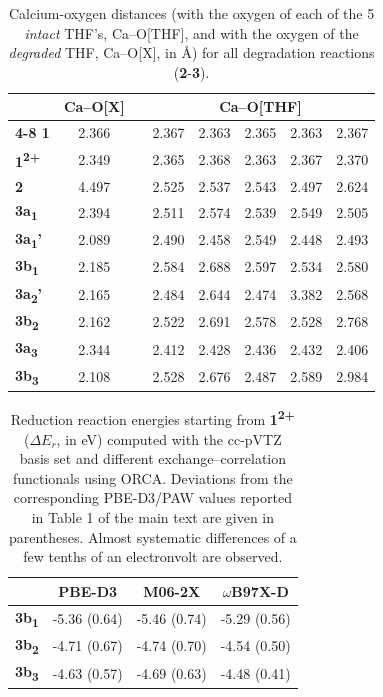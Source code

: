 \documentclass[a4paper,titlepage]{article}
\begin{document}
\begin{table}
	\centering
	\begin{tabular}{>{\bfseries}lc c ccccc}
		\toprule
		& Ca--O[X] & & \multicolumn{5}{c}{Ca--O[THF]} \\
		\cmidrule{4-8}
		1 & 2.366 &  & 2.367 & 2.363 & 2.365 & 2.363 & 2.367 \\
		1\textsuperscript{2+} & 2.349 &  & 2.365 & 2.368 & 2.363 & 2.367 & 2.370 \\
		2 & 4.497 &  & 2.525 & 2.537 & 2.543 & 2.497 & 2.624 \\
		3a\textsubscript{1} & 2.394 &  & 2.511 & 2.574 & 2.539 & 2.549 & 2.505 \\
		3a\textsubscript{1}’ & 2.089 &  & 2.490 & 2.458 & 2.549 & 2.448 & 2.493 \\
		3b\textsubscript{1} & 2.185 &  & 2.584 & 2.688 & 2.597 & 2.534 & 2.580 \\
		3a\textsubscript{2}’ & 2.165 &  & 2.484 & 2.644 & 2.474 & 3.382 & 2.568 \\
		3b\textsubscript{2} & 2.162 &  & 2.522 & 2.691 & 2.578 & 2.528 & 2.768 \\
		3a\textsubscript{3} & 2.344 &  & 2.412 & 2.428 & 2.436 & 2.432 & 2.406 \\
		3b\textsubscript{3} & 2.108 &  & 2.528 & 2.676 & 2.487 & 2.589 & 2.984 \\
		\bottomrule
	\end{tabular}
	\caption{Calcium-oxygen distances (with the oxygen of each of the 5 \textit{intact} THF's, Ca--O[THF], and with the oxygen of the \textit{degraded} THF, Ca--O[X], in \si{\angstrom}) for all degradation reactions (\textbf{2}-\textbf{3}).}
	\label{tab:dists}
\end{table}

\begin{table}
	\centering
	\begin{tabular}{>{\bfseries}l ccc}
		\toprule
		&PBE-D3	&M06-2X&	$\omega$B97X-D\\
		\midrule
		3b\textsubscript{1}	&-5.36 (0.64)&	-5.46 (0.74)&	-5.29 (0.56) \\
		3b\textsubscript{2}	&-4.71 (0.67)&	-4.74 (0.70)&	-4.54 (0.50) \\
		3b\textsubscript{3}	&-4.63 (0.57)	&-4.69 (0.63)&	-4.48 (0.41) \\
		\bottomrule
	\end{tabular}
	\caption{Reduction reaction energies starting from \textbf{1\textsuperscript{2+}} ($\Delta E_r$, in \si{\electronvolt}) computed with the cc-pVTZ basis set and different exchange--correlation functionals using ORCA.\cite{ORCA6} Deviations from the corresponding PBE-D3/PAW values reported in Table 1 of the main text are given in parentheses. Almost systematic differences of a few tenths of an electronvolt are observed.}
	\label{tab:dex}
\end{table}
\end{document}
